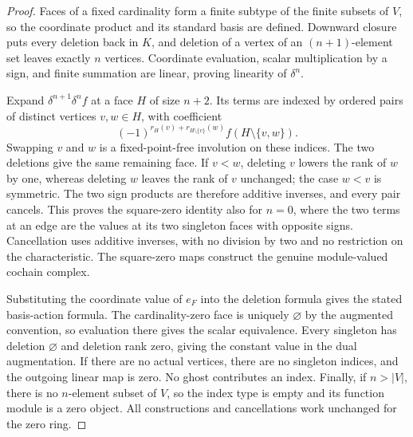 \begin{proof}
\leanok
Faces of a fixed cardinality form a finite subtype of the finite subsets
of $V$, so the coordinate product and its standard basis are defined.
Downward closure puts every deletion back in $K$, and deletion of a vertex
of an $(n+1)$-element set leaves exactly $n$ vertices. Coordinate evaluation,
scalar multiplication by a sign, and finite summation are linear, proving
linearity of $\delta^n$.

Expand $\delta^{n+1}\delta^n f$ at a face $H$ of size $n+2$.
Its terms are indexed by ordered pairs of distinct vertices $v,w\in H$,
with coefficient
\[
 (-1)^{r_H(v)+r_{H\setminus\{v\}}(w)}
                      f(H\setminus\{v,w\}).
\]
Swapping $v$ and $w$ is a fixed-point-free involution on these indices.
The two deletions give the same remaining face. If $v<w$, deleting $v$
lowers the rank of $w$ by one, whereas deleting $w$ leaves the rank of
$v$ unchanged; the case $w<v$ is symmetric. The two sign products are
therefore additive inverses, and every pair cancels. This proves the
square-zero identity also for $n=0$, where the two terms at an edge are
the values at its two singleton faces with opposite signs. Cancellation
uses additive inverses, with no division by two and no restriction on the
characteristic. The square-zero maps construct the genuine module-valued
cochain complex.

Substituting the coordinate value of $e_F$ into the deletion formula gives
the stated basis-action formula. The cardinality-zero face is uniquely
$\varnothing$ by the augmented convention, so evaluation there gives the
scalar equivalence. Every singleton has deletion $\varnothing$ and deletion
rank zero, giving the constant value in the dual augmentation. If there
are no actual vertices, there are no singleton indices, and the outgoing
linear map is zero. No ghost contributes an index. Finally, if $n>|V|$,
there is no $n$-element subset of $V$, so the index type is empty and its
function module is a zero object. All constructions and cancellations work
unchanged for the zero ring.
\end{proof}

